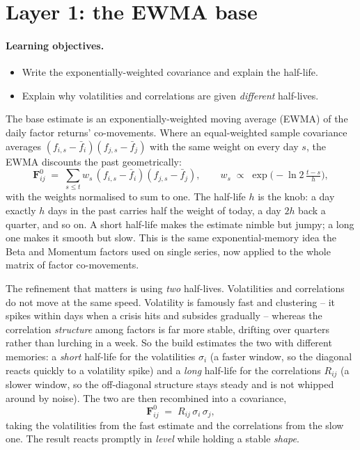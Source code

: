 \documentclass[11pt]{article}
\theoremstyle{definition}
\theoremstyle{plain}
\theoremstyle{remark}
\newcommand{\Fmat}{\mathbf{F}}
\begin{document}
\section{Layer 1: the EWMA base}\label{sec:ewma}

\paragraph{Learning objectives.}
\begin{itemize}[leftmargin=1.4em,topsep=2pt]
  \item Write the exponentially-weighted covariance and explain the half-life.
  \item Explain why volatilities and correlations are given \emph{different} half-lives.
\end{itemize}

The base estimate is an exponentially-weighted moving average (EWMA) of the daily factor returns' co-movements. Where an equal-weighted sample covariance averages $(f_{i,s}-\bar f_i)(f_{j,s}-\bar f_j)$ with the same weight on every day $s$, the EWMA discounts the past geometrically:
\[
\Fmat^{0}_{ij} \;=\; \sum_{s\le t} w_s\,(f_{i,s}-\bar f_i)(f_{j,s}-\bar f_j),
\qquad
w_s \;\propto\; \exp\!\Big(-\ln 2\,\tfrac{t-s}{h}\Big),
\]
with the weights normalised to sum to one. The half-life $h$ is the knob: a day exactly $h$ days in the past carries half the weight of today, a day $2h$ back a quarter, and so on. A short half-life makes the estimate nimble but jumpy; a long one makes it smooth but slow. This is the same exponential-memory idea the Beta and Momentum factors used on single series, now applied to the whole matrix of factor co-movements.

The refinement that matters is using \emph{two} half-lives. Volatilities and correlations do not move at the same speed. Volatility is famously fast and clustering -- it spikes within days when a crisis hits and subsides gradually -- whereas the correlation \emph{structure} among factors is far more stable, drifting over quarters rather than lurching in a week. So the build estimates the two with different memories: a \emph{short} half-life for the volatilities $\sigma_i$ (a faster window, so the diagonal reacts quickly to a volatility spike) and a \emph{long} half-life for the correlations $R_{ij}$ (a slower window, so the off-diagonal structure stays steady and is not whipped around by noise). The two are then recombined into a covariance,
\[
\Fmat^{0}_{ij} \;=\; R_{ij}\,\sigma_i\,\sigma_j ,
\]
taking the volatilities from the fast estimate and the correlations from the slow one. The result reacts promptly in \emph{level} while holding a stable \emph{shape}.
\end{document}
